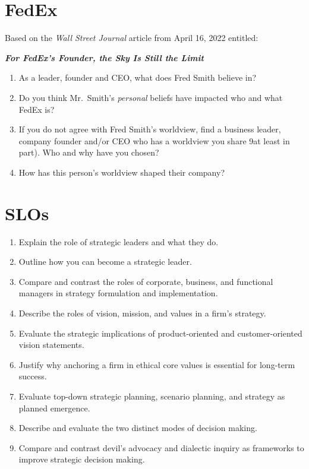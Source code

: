 \documentclass[
]{book}
\providecommand{\tightlist}{%
  \setlength{\itemsep}{0pt}\setlength{\parskip}{0pt}}
\begin{document}
\hypertarget{fedex}{%
\section{FedEx}\label{fedex}}

Based on the \emph{Wall Street Journal} article from April 16, 2022 entitled:

\textbf{\emph{For FedEx's Founder, the Sky Is Still the Limit}}

\begin{enumerate}
\def\labelenumi{\arabic{enumi}.}
\tightlist
\item
  As a leader, founder and CEO, what does Fred Smith believe in?
\item
  Do you think Mr.~Smith's \emph{personal} beliefs have impacted who and what FedEx is?
\item
  If you do not agree with Fred Smith's worldview, find a business leader, company founder and/or CEO who has a worldview you share 9at least in part). Who and why have you chosen?
\item
  How has this person's worldview shaped their company?
\end{enumerate}

\hypertarget{slos-1}{%
\section{SLOs}\label{slos-1}}

\begin{enumerate}
\def\labelenumi{\arabic{enumi}.}
\tightlist
\item
  Explain the role of strategic leaders and what they do.
\item
  Outline how you can become a strategic leader.
\item
  Compare and contrast the roles of corporate, business, and functional managers in strategy formulation and implementation.
\item
  Describe the roles of vision, mission, and values in a firm's strategy.
\item
  Evaluate the strategic implications of product-oriented and customer-oriented vision statements.
\item
  Justify why anchoring a firm in ethical core values is essential for long-term success.
\item
  Evaluate top-down strategic planning, scenario planning, and strategy as planned emergence.
\item
  Describe and evaluate the two distinct modes of decision making.
\item
  Compare and contrast devil's advocacy and dialectic inquiry as frameworks to improve strategic decision making.
\end{enumerate}
\end{document}
